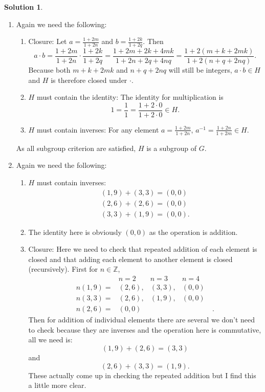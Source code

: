 \documentclass[10pt]{article}
\theoremstyle{definition}
\newtheorem{soln}{Solution}
\begin{document}
\begin{soln}
\begin{enumerate}[label=(\alph*)]
    \item Again we need the following:
          \begin{enumerate}[label=(\roman*)]
            \item Closure: Let $a=\frac{1+2m}{1+2n}$ and $b=\frac{1+2k}{1+2q}$. Then
                  $$a\cdot b =\frac{1+2m}{1+2n}\cdot \frac{1+2k}{1+2q}=\frac{1+2m+2k+4mk}{1+2n+2q+4nq}=\frac{1+2(m+k+2mk)}{1+2(n+q+2nq)}.$$
                  Because both $m+k+2mk$ and $n+q+2nq$ will still be integers, $a\cdot b\in H$ and $H$ is therefore closed under $\cdot$.
            \item $H$ must contain the identity: The identity for multiplication is
                  $$1=\frac{1}{1}=\frac{1+2\cdot 0}{1+2\cdot 0}\in H.$$
            \item $H$ must contain inverses: For any element $a=\frac{1+2m}{1+2n}$, $a^{-1}=\frac{1+2n}{1+2m}\in H.$
          \end{enumerate}
          As all subgroup criterion are satisfied, $H$ is a subgroup of $G$.
    \item Again we need the following:
          \begin{enumerate}[label=(\roman*)]
            \item $H$ must contain inverses:
                  \begin{align*}
                    (1,9)+(3,3)=(0,0) \\
                    (2,6)+(2,6)=(0,0) \\
                    (3,3)+(1,9)=(0,0).
                  \end{align*}
            \item The identity here is obviously $(0,0)$ as the operation is addition.
            \item Closure: Here we need to check that repeated addition of each element is closed
                  and that adding each element to another element is closed (recursively).
                  First  for $n\in \mathbb{Z}$,
                  $$\begin{array}{ccccc}
                              & n=2    & n=3    & n=4   &    \\
                      n(1,9)= & (2,6), & (3,3), & (0,0) & ~  \\
                      n(3,3)= & (2,6), & (1,9), & (0,0) & ~  \\
                      n(2,6)= & (0,0)  & ~      & ~     & ~.
                    \end{array}$$
                  Then for addition of individual elements there are several we don't need to check because they are inverses
                  and the operation here is commutative, all we need is:
                  $$(1,9)+(2,6)=(3,3)$$
                  and
                  $$(2,6)+(3,3)=(1,9).$$
                  These actually come up in checking the repeated addition but I find this a little more clear.
          \end{enumerate}
  \end{enumerate}
\end{soln}
\end{document}
